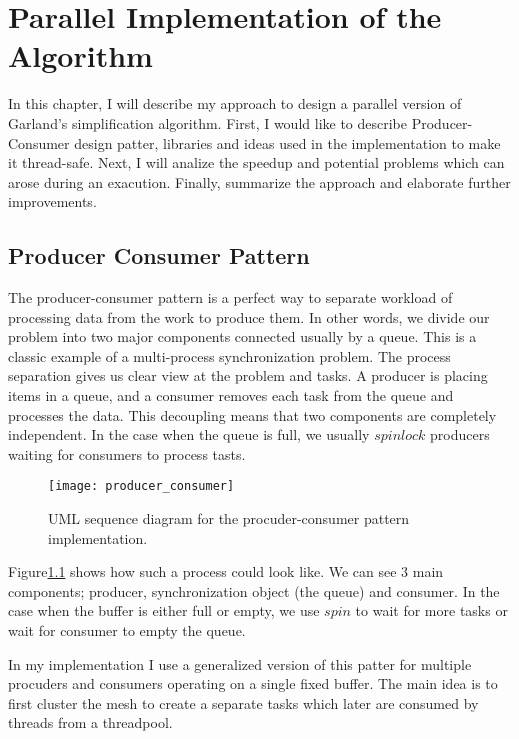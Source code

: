 \chapter{Parallel Implementation of the Algorithm}

In this chapter, I will describe my approach to design a parallel version of Garland's simplification algorithm. First, I would like to describe Producer-Consumer design patter, libraries and ideas used in the implementation to make it thread-safe. Next, I will analize the speedup and potential problems which can arose during an exacution. Finally, summarize the approach and elaborate further improvements.

\section{Producer Consumer Pattern}

The producer-consumer pattern is a perfect way to separate workload of processing data from the work to produce them. In other words, we divide our problem into two major components connected usually by a queue. This is a classic example of a multi-process synchronization problem. The process separation gives us clear view at the problem and tasks. A producer is placing items in a queue, and a consumer removes each task from the queue and processes the data. This decoupling means that two components are completely independent. In the case when the queue is full, we usually $spinlock$ producers waiting for consumers to process tasts.

\begin{figure}[H]
  \begin{center}
    \texttt{[image: producer\_consumer]}
    \caption{UML sequence diagram for the procuder-consumer pattern implementation.}
    \label{fig:uml}
  \end{center}
\end{figure}

Figure\ref{fig:uml} shows how such a process could look like. We can see 3 main components; producer, synchronization object (the queue) and consumer. In the case when the buffer is either full or empty, we use $spin$ to wait for more tasks or wait for consumer to empty the queue.

In my implementation I use a generalized version of this patter for multiple procuders and consumers operating on a single fixed buffer. The main idea is to first cluster the mesh to create a separate tasks which later are consumed by threads from a threadpool.

